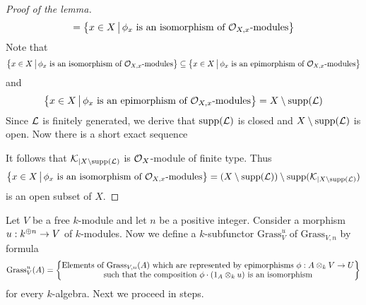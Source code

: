 \begin{proof}[Proof of the lemma]
$$= \big\{x\in X\,\big|\,\phi_{x}\mbox{ is an isomorphism of }{\mathcal O}_{X,x}\mbox{-modules}\big\}$$
Note that
$$\big\{x\in X\,\big|\,\phi_{x}\mbox{ is an isomorphism of }{\mathcal O}_{X,x}\mbox{-modules}\big\}\subseteq \big\{x\in X\,\big|\,\phi_{x}\mbox{ is an epimorphism of }{\mathcal O}_{X,x}\mbox{-modules}\big\}$$
and
$$\big\{x\in X\,\big|\,\phi_{x}\mbox{ is an epimorphism of }{\mathcal O}_{X,x}\mbox{-modules}\big\} = X\setminus \mathrm{supp}({\mathcal L})$$
Since ${\mathcal L}$ is finitely generated, we derive that $\mathrm{supp}({\mathcal L})$ is closed and $X\setminus \mathrm{supp}({\mathcal L})$ is open. Now there is a short exact sequence
\begin{center}
\end{center}
It follows that ${\mathcal K}_{\mid X\setminus \mathrm{supp}({\mathcal L})}$ is ${\mathcal O}_X$-module of finite type. Thus
$$\big\{x\in X\,\big|\,\phi_{x}\mbox{ is an isomorphism of }{\mathcal O}_{X,x}\mbox{-modules}\big\} = \left(X\setminus \mathrm{supp}({\mathcal L})\right)\setminus \mathrm{supp}({\mathcal K}_{\mid X\setminus \mathrm{supp}({\mathcal L})})$$
is an open subset of $X$.
\end{proof}
\noindent
Let $V$ be a free $k$-module and let $n$ be a positive integer. Consider a morphism $u:k^{\oplus n} \rightarrow V$ of $k$-modules. Now we define a $k$-subfunctor $\mathrm{Grass}_{V}^u$ of $\mathrm{Grass}_{V,n}$ by formula
$$\mathrm{Grass}_{V}^u(A) =\bigg\{\begin{subarray}{c}
\mbox{Elements of $\mathrm{Grass}_{V,n}(A)$ which are represented by epimorphisms $\phi:A\otimes_kV\rightarrow U$}\\
\mbox{such that the composition $\phi\cdot \left(1_A\otimes_k u\right)$ is an isomorphism}
\end{subarray}\bigg\}$$
for every $k$-algebra. Next we proceed in steps.

